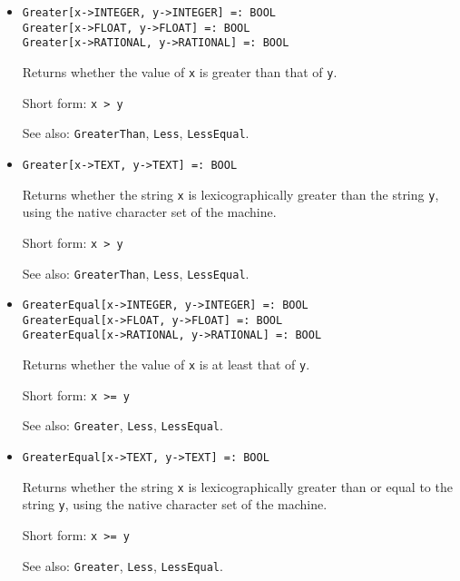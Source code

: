 \begin{itemize}
\item
\protect \large \begin{verbatim}
Greater[x->INTEGER, y->INTEGER] =: BOOL
Greater[x->FLOAT, y->FLOAT] =: BOOL
Greater[x->RATIONAL, y->RATIONAL] =: BOOL
\end{verbatim}\normalsize

\bd
Returns whether the value of \verb+x+ is greater than
that of \verb+y+.
\item
[Short form:] \verb+x > y+
\item
[See also:] {\tt GreaterThan}, {\tt Less}, {\tt LessEqual}.
\ed

\item
\protect \large \begin{verbatim}
Greater[x->TEXT, y->TEXT] =: BOOL
\end{verbatim}\normalsize

\bd
Returns whether the string \verb+x+ is lexicographically greater than
the string \verb+y+, using the native character set of the machine.
\item
[Short form:] \verb+x > y+
\item
[See also:] {\tt GreaterThan}, {\tt Less}, {\tt LessEqual}.
\ed

\item
\protect \large \begin{verbatim}
GreaterEqual[x->INTEGER, y->INTEGER] =: BOOL
GreaterEqual[x->FLOAT, y->FLOAT] =: BOOL
GreaterEqual[x->RATIONAL, y->RATIONAL] =: BOOL
\end{verbatim}\normalsize

\bd
Returns whether the value of \verb+x+ is at least that of
\verb+y+.
\item
[Short form:] \verb+x >= y+
\item
[See also:] {\tt Greater}, {\tt Less}, {\tt LessEqual}.
\ed

\item
\protect \large \begin{verbatim}
GreaterEqual[x->TEXT, y->TEXT] =: BOOL
\end{verbatim}\normalsize

\bd
Returns whether the string \verb+x+ is lexicographically greater than
or equal to the string \verb+y+, using the native character set of the
machine.
\item
[Short form:] \verb+x >= y+
\item
[See also:] {\tt Greater}, {\tt Less}, {\tt LessEqual}.
\ed




\end{itemize}
